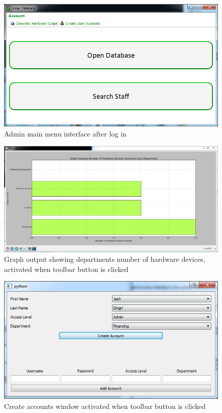 \begin{figure}[H]
    \includegraphics[width=\textwidth]{./Maintenance/Images/adminmainmenu.png}
    \caption{Admin main menu interface after log in} \label{fig:adminmainmenu}
\end{figure}

\begin{figure}[H]
    \includegraphics[width=\textwidth]{./Maintenance/Images/graph.png}
    \caption{Graph output showing departments number of hardware devices, activated when toolbar button is clicked} \label{fig:graph}
\end{figure}

\begin{figure}[H]
    \includegraphics[width=\textwidth]{./Maintenance/Images/createaccounts.png}
    \caption{Create accounts window activated when toolbar button is clicked} \label{fig:createaccounts}
\end{figure}

